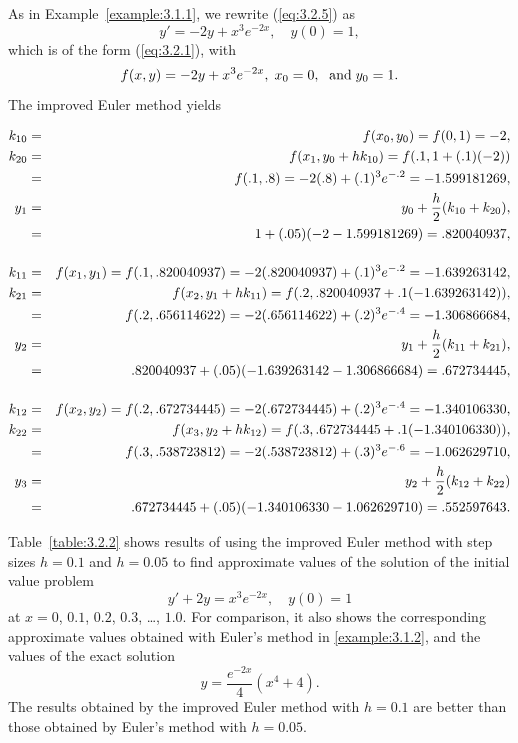 \begin{examplesolution}
\solution As in Example~\ref{example:3.1.1}, we rewrite (\ref{eq:3.2.5}) as
\[
  y'=-2y+x^{3}e^{-2x},\quad y(0)=1,
\]
which is of the form (\ref{eq:3.2.1}), with
\[
  f(x,y)=-2y+x^{3}e^{-2x},\;x_{0}=0,\mbox{\; and}\;y_{0}=1.
\]
The improved Euler method yields

\enlargethispage{.75in}
\begin{eqnarray*}
  k_{10} & = & f(x_{0},y_{0})=f(0,1)=-2,                                                    \\
  k_{20} & = & f(x_{1},y_{0}+hk_{10})=f(.1,1+(.1)(-2))                                      \\
         & = & f(.1,.8)=-2(.8)+(.1)^{3}e^{-.2}=-1.599181269,                                \\
  y_{1}  & = & y_{0}+\frac{h}{2}(k_{10}+k_{20}),                                            \\
         & = & 1+(.05)(-2-1.599181269)=.820040937,                                          \\[4\jot]
  k_{11} & = & f(x_{1},y_{1})=f(.1,.820040937)=-2(.820040937)+(.1)^{3}e^{-.2}=-1.639263142, \\
  k_{21} & = & f(x_{2},y_{1}+hk_{11})=f(.2,.820040937+.1(-1.639263142)),                    \\
         & = & f(.2,.656114622)=-2(.656114622)+(.2)^{3}e^{-.4}=-1.306866684,                \\
  y_{2}  & = & y_{1}+\frac{h}{2}(k_{11}+k_{21}),                                            \\
         & = & .820040937+(.05)(-1.639263142-1.306866684)=.672734445,                       \\[4\jot]
  k_{12} & = & f(x_{2},y_{2})=f(.2,.672734445)=-2(.672734445)+(.2)^{3}e^{-.4}=-1.340106330, \\
  k_{22} & = & f(x_{3},y_{2}+hk_{12})=f(.3,.672734445+.1(-1.340106330)),                    \\
         & = & f(.3,.538723812)=-2(.538723812)+(.3)^{3}e^{-.6}=-1.062629710,                \\
  y_{3}  & = & y_{2}+\frac{h}{2}(k_{12}+k_{22})                                             \\
         & = & .672734445+(.05)(-1.340106330-1.062629710)=.552597643.
\end{eqnarray*}
\end{examplesolution}

\begin{example}
  \label{example:3.2.2} \rm Table~\ref{table:3.2.2} shows results of using the improved Euler method
  with step sizes $h=0.1$ and $h=0.05$ to find approximate values of the solution of the initial
  value problem
  \[
    y'+2y=x^{3}e^{-2x},\quad y(0)=1
  \]
  at $x=0$, $0.1$, $0.2$, $0.3$, \dots, $1.0$. For comparison, it also shows the corresponding
  approximate values obtained with Euler's method in \ref{example:3.1.2}, and the values of the
  exact solution
  \[
    y=\frac{e^{-2x}}{4}(x^{4}+4).
  \]
  The results obtained by the improved Euler method with $h=0.1$ are better than those obtained by
  Euler's method with $h=0.05$.
\end{example}

